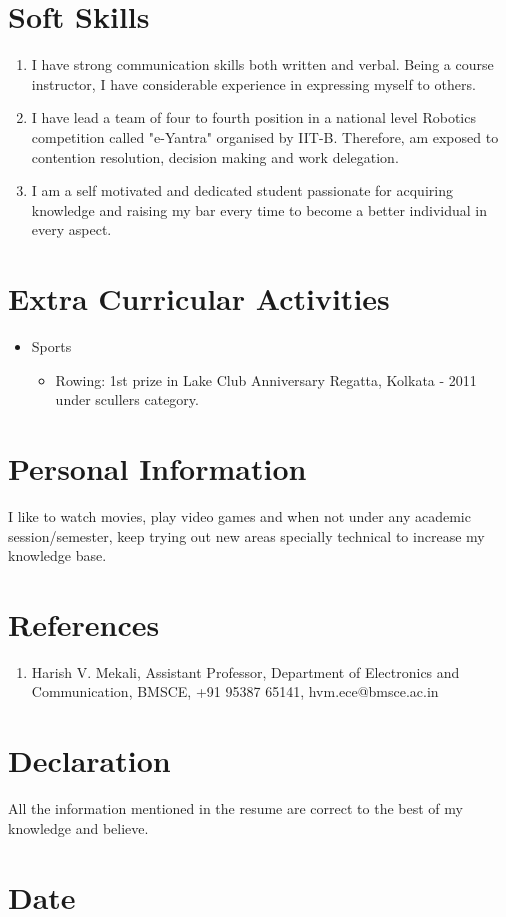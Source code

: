 \documentclass[11pt,a4paper,sans]{moderncv}        %
\begin{document}
\section{Soft Skills}
\begin{enumerate}
	\item I have strong communication skills both written and verbal.
	      Being a course instructor, I have considerable experience in expressing myself to others.
	\item I have lead a team of four to fourth position in a national level Robotics competition 
	      called "e-Yantra" organised by IIT-B. Therefore, am exposed to contention resolution, decision making
	      and work delegation.
	\item I am a self motivated and dedicated student passionate for acquiring knowledge and raising my bar every time to become a better individual in every aspect.
\end{enumerate}
\section{Extra Curricular Activities}
\begin{itemize}
	\item Sports
	\begin{itemize}
		\item Rowing: 1st prize in Lake Club Anniversary Regatta, Kolkata - 2011 under scullers category.
	\end{itemize}
\end{itemize}
\section{Personal Information}
 I like to watch movies, play video games and when not under any academic session/semester, keep trying out new areas specially technical to increase my knowledge base.  
\section{References}
\begin{enumerate}
	\item Harish V. Mekali, Assistant Professor, Department of Electronics and Communication, BMSCE, +91 95387 65141,
	hvm.ece@bmsce.ac.in
\end{enumerate}

\section{Declaration}
All the information mentioned in the resume are correct to the best of my knowledge and believe.
\section{Date}
\date{}
\end{document}
